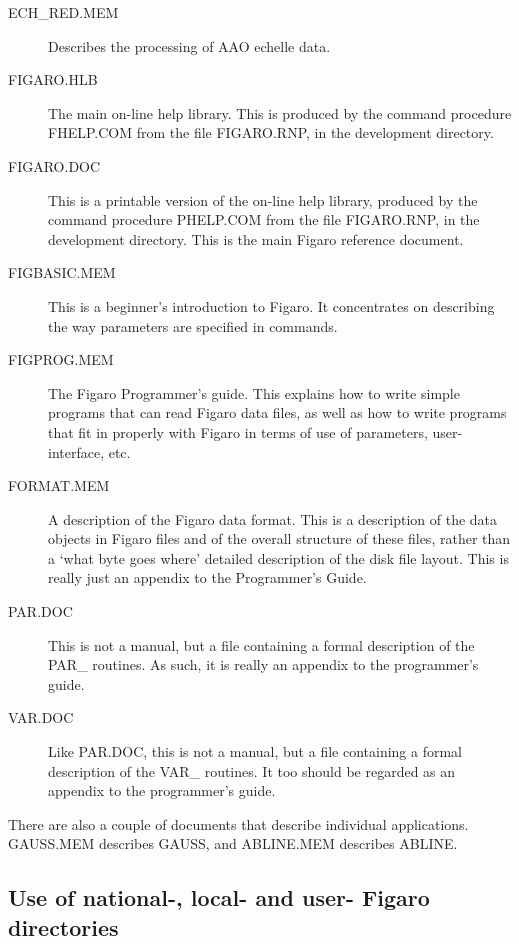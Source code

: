 \begin{description}
\item [ECH\_RED.MEM] Describes the processing of AAO echelle data.

\item [FIGARO.HLB] The main on-line help library. This is produced by the
command procedure FHELP.COM from the file FIGARO.RNP, in the development
directory.

\item [FIGARO.DOC] This is a printable version of the on-line help
library, produced by the command procedure PHELP.COM from the file
FIGARO.RNP, in the development directory.  This is the main Figaro
reference document.

\item [FIGBASIC.MEM] This is a beginner's introduction to Figaro.  It
concentrates on describing the way parameters are specified in commands.

\item [FIGPROG.MEM] The Figaro Programmer's guide.  This explains how to
write simple programs that can read Figaro data files, as well as how to
write programs that fit in properly with Figaro in terms of use of parameters,
user-interface, etc.

\item [FORMAT.MEM] A description of the Figaro data format. This is a
description of the data objects in Figaro files and of the overall structure
of these files, rather than a `what byte goes where' detailed description of
the disk file layout. This  is  really  just  an  appendix to the
Programmer's Guide.

\item [PAR.DOC] This is not a manual, but  a  file containing  a
formal description of the PAR\_ routines. As such, it is really an
appendix to the programmer's guide.

\item [VAR.DOC] Like PAR.DOC, this is not a manual, but a file containing a
formal description of the VAR\_ routines.  It too should be regarded as
an appendix to the programmer's guide.

\end{description}

There are also a couple of documents that describe individual applications.
GAUSS.MEM describes GAUSS, and ABLINE.MEM describes ABLINE.

\subsection{Use of national-, local- and user- Figaro directories}

